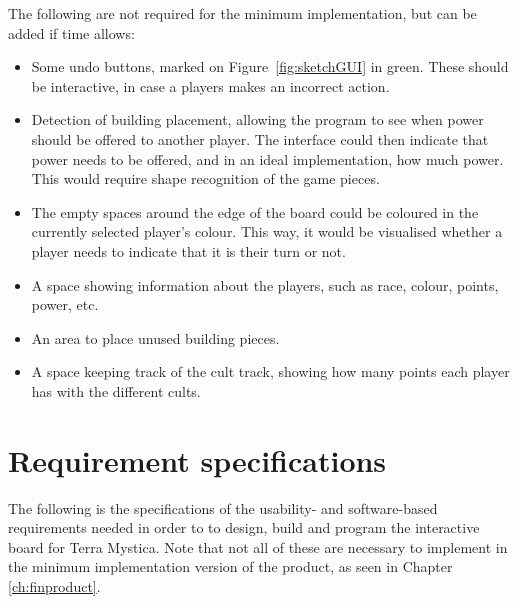 The following are not required for the minimum implementation, but can be added if time allows:
\begin{itemize}
\item Some undo buttons, marked on Figure~\ref{fig:sketchGUI} in green. These should be interactive, in case a players makes an incorrect action.
\item Detection of building placement, allowing the program to see when power should be offered to another player. The interface could then indicate that power needs to be offered, and in an ideal implementation, how much power. This would require shape recognition of the game pieces.
\item The empty spaces around the edge of the board could be coloured in the currently selected player's colour. This way, it would be visualised whether a player needs to indicate that it is their turn or not.
\item A space showing information about the players, such as race, colour, points, power, etc.
\item An area to place unused building pieces.
\item A space keeping track of the cult track, showing how many points each player has with the different cults.
\end{itemize}

\section{Requirement specifications}\label{sec:ReqSpec}
The following is the specifications of the usability- and software-based requirements needed in order to to design, build and program the interactive board for Terra Mystica. Note that not all of these are necessary to implement in the minimum implementation version of the product, as seen in Chapter \ref{ch:finproduct}.

